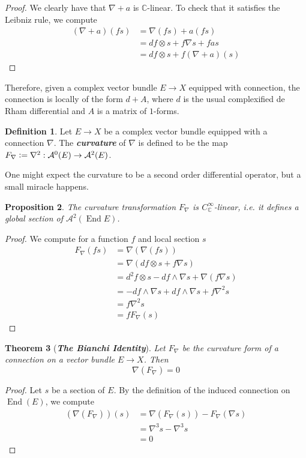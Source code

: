 \documentclass[psamsfonts, 12pt]{amsart}
\newtheorem{thm}{Theorem}[section]
\newtheorem{prop}[thm]{Proposition}
\theoremstyle{definition}
\newtheorem{defn}[thm]{Definition}
\theoremstyle{remark}
\newcommand{\ib}[1]{\textbf{\textit{#1}}}
\newcommand{\C}{\mathbb{C}}
\newcommand{\defeq}{\vcentcolon=}
\DeclareMathOperator{\End}{End}
\begin{document}
%
\begin{proof}
We clearly have that $\nabla + a$ is $\C$-linear. To check that it satisfies the
Leibniz rule, we compute
\begin{align*}
(\nabla + a)(fs) &= \nabla(fs) + a(fs) \\
&= df \otimes s + f\nabla s + fas \\
&= df \otimes s + f(\nabla + a)(s)
\end{align*}
\end{proof}
%
Therefore, given a complex vector bundle $E \to X$ equipped with connection, the
connection is locally of the form $d + A$, where $d$ is the usual complexified
de Rham differential and $A$ is a matrix of $1$-forms.
%
\begin{defn}
Let $E \to X$ be a complex vector bundle equipped with a connection $\nabla$.
The \ib{curvature} of $\nabla$ is defined to be the map
$F_{\nabla} \defeq \nabla^2 : \mathcal{A}^0(E) \to \mathcal{A}^2(E)$.
\end{defn}
%
One might expect the curvature to be a second order differential operator, but a
small miracle happens.
%
\begin{prop}
The curvature transformation $F_\nabla$ is $C^\infty_\C$-linear, i.e. it defines
a global section of $\mathcal{A}^2(\End E)$.
\end{prop}
%
\begin{proof}
We compute for a function $f$ and local section $s$
\begin{align*}
F_\nabla(fs) &= \nabla(\nabla(fs)) \\
&= \nabla(df \otimes s + f\nabla s) \\
&= d^2f \otimes s - df \wedge \nabla s + \nabla(f\nabla s) \\
&= -df \wedge \nabla s + df \wedge \nabla s + f\nabla^2 s \\
&= f\nabla^2 s \\
&= fF_\nabla(s)
\end{align*}
\end{proof}
%
\begin{thm}[\ib{The Bianchi Identity}]
Let $F_\nabla$ be the curvature form of a connection on a vector bundle $E \to X$.
Then
\[
\nabla(F_\nabla) = 0
\]
\end{thm}
%
\begin{proof}
Let $s$ be a section of $E$. By the definition of the induced connection on $\End(E)$, we
compute
\begin{align*}
(\nabla(F_\nabla))(s) &= \nabla(F_\nabla(s)) - F_\nabla(\nabla s) \\
&= \nabla^3s - \nabla^3s \\
&= 0
\end{align*}
\end{proof}
\end{document}
